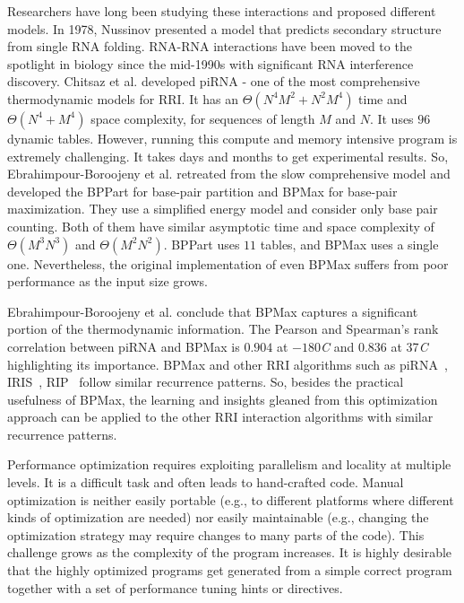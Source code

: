 \documentclass[conference]{IEEEtran}
\begin{document}
Researchers have long been studying these interactions and proposed different models. In 1978, Nussinov presented a model \cite{Nussinov1978} that predicts secondary structure from single RNA folding. RNA-RNA interactions have been moved to the spotlight in biology since the mid-1990s with significant RNA interference discovery. Chitsaz et al.\cite{Chitsaz2009} developed piRNA - one of the most comprehensive thermodynamic models for RRI.  It has an $\Theta(N^4M^2+N^2M^4)$  time and $\Theta(N^4+M^4)$ space complexity, %
for sequences of length $M$ and $N$. It uses $96$ dynamic tables.  However, running this compute and memory intensive program is extremely challenging. It takes days and months to get experimental results. So, Ebrahimpour-Boroojeny et al. \cite{EbrahimpourBoroojeny2019}  retreated from the slow comprehensive model and developed the BPPart for base-pair partition and BPMax for base-pair maximization. They use a simplified energy model and consider only base pair counting. Both of them have similar asymptotic time and space complexity of $\Theta(M^3N^3)$  and $\Theta(M^2N^2)$. BPPart uses $11$ tables, and BPMax uses a single one.  Nevertheless, the original implementation of even BPMax suffers from poor performance as the input size grows.

Ebrahimpour-Boroojeny et al. conclude that BPMax \cite{EbrahimpourBoroojeny2019} captures a significant portion of the thermodynamic information. The Pearson and Spearman’s rank correlation between piRNA and BPMax is  $0.904$ at $-180$\textdegree\textit{C} and  $0.836$  at 37\textdegree\textit{C} highlighting its importance.  BPMax and other RRI algorithms such as piRNA~\cite{Chitsaz2009}, IRIS~\cite{Pervouchine2004IRISIR}, RIP~\cite{Huang2009} follow similar recurrence patterns. So, besides the practical usefulness of BPMax, the learning and insights gleaned from this optimization approach can be applied to the other RRI interaction algorithms with similar recurrence patterns.


Performance optimization requires exploiting parallelism and locality at multiple levels. It is a difficult task and often leads to hand-crafted code. Manual optimization is neither easily portable (e.g., to different platforms where different kinds of optimization are needed) nor easily maintainable (e.g., changing the optimization strategy may require changes to many parts of the code). This challenge grows as the complexity of the program increases. It is highly desirable that the highly optimized programs get generated from a simple correct program together with a set of performance tuning hints or directives.
\end{document}
